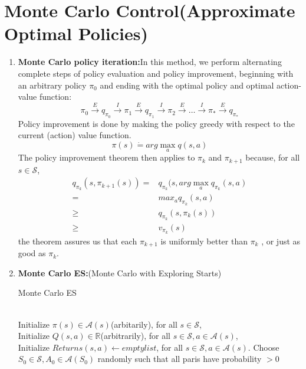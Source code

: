 \section{Monte Carlo Control(Approximate Optimal Policies)}
\begin{enumerate}
	\item \textbf{Monte Carlo policy iteration:}In this method, we perform alternating complete steps of policy evaluation and policy improvement, beginning with an arbitrary policy $\pi_0$ and ending with the optimal policy and optimal action-value function:
	$$\pi_0 \xrightarrow{E} q_{\pi_0} \xrightarrow{I}
	\pi_1 \xrightarrow{E} q_{\pi_1} \xrightarrow{I} \pi_2 \xrightarrow{E} \dots \xrightarrow{I} \pi_* \xrightarrow{E} q_{\pi_*}$$
	Policy improvement is done by making the policy greedy with respect to the current (action) value function. 
	\begin{equation}
		\pi(s) \dot{=} arg \max_{a} q(s,a)
	\end{equation}
	 The policy improvement theorem then applies to $\pi_k$ and $\pi_{k+1}$ because, for all $s \in \mathcal{S}$,
	 \begin{equation}
	 \begin{split}
	 	q_{\pi_k}(s, \pi_{k+1}(s)) = & q_{\pi_k}(s, arg \max_a q_{\pi_k}(s,a) \\
	 		= & max_a q_{\pi_k}(s,a) \\
	 		\geq & q_{\pi_k}(s, \pi_k(s)) \\
	 		\geq & v_{\pi_k}(s)
	 \end{split}
	 \end{equation}
	 the theorem assures us that each $\pi_{k+1}$ is uniformly better than $\pi_k$ , or just as good as $\pi_k$.

	\item \textbf{Monte Carlo ES:}(Monte Carlo with Exploring Starts)
	
	\begin{algorithm}[H]
	\label{alg:monte_carlo_es}
	\caption{Monte Carlo ES}
	\begin{algorithmic}[1]
	\Require \\Initialize $\pi(s) \in \mathcal{A}(s)$(arbitarily), for all $s \in \mathcal{S}$,\\
	Initialize $Q(s,a) \in \mathbb{R}$(arbitrarily), for all $s \in \mathcal{S}, a \in \mathcal{A}(s)$,\\
	Initialize $Returns(s, a) \leftarrow empty list$, for all $s \in \mathcal{S}, a \in \mathcal{A}(s)$.
	\Statex
	\Repeat
		\State Choose \begin{math} S_0 \in \mathcal{S}, A_0 \in \mathcal{A}(S_0) \end{math} randomly such that all paris have probability \begin{math} > 0 \end{math}


\end{algorithmic}
\end{algorithm}
\end{enumerate}
